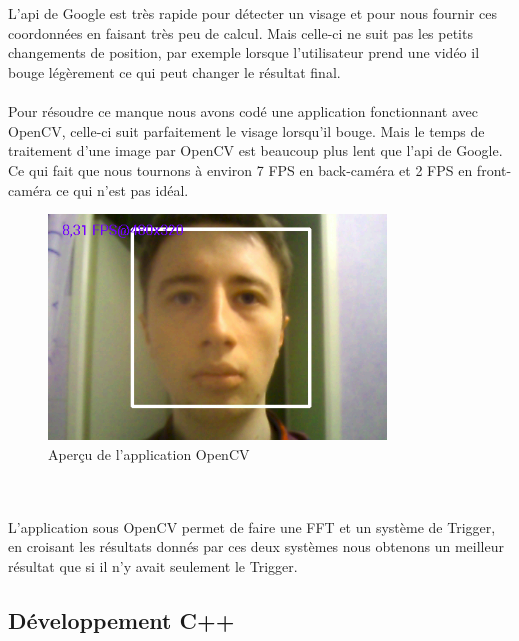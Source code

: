 	\\
	\\
	L'api de Google est très rapide pour détecter un visage et pour nous fournir ces coordonnées en faisant très peu de calcul. Mais celle-ci ne suit pas les petits changements de position, par exemple lorsque l'utilisateur prend une vidéo il bouge légèrement ce qui peut changer le résultat final.
	\\
	\\
	Pour résoudre ce manque nous avons codé une application fonctionnant avec OpenCV, celle-ci suit parfaitement le visage lorsqu'il bouge. Mais le temps de traitement d'une image par OpenCV est beaucoup plus lent que l'api de Google. Ce qui fait que nous tournons à environ 7 FPS en back-caméra et 2 FPS en front-caméra ce qui n'est pas idéal.
	\begin{figure}[h!]
			\centering
			\includegraphics[width=0.8\textwidth]{data/opencv.png}
			\caption{Aperçu de l'application OpenCV}
		\end{figure}
	\\
	\\
	L'application sous OpenCV permet de faire une FFT et un système de Trigger, en croisant les résultats donnés par ces deux systèmes nous obtenons un meilleur résultat que si il n'y avait seulement le Trigger.  

\subsection{Développement C++}

